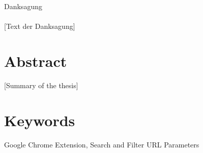 \documentclass[oneside,bibliography=totocnumbered,BCOR=5mm]{scrbook}%
\theoremstyle{definition}
\theoremstyle{definition}
\theoremstyle{definition}
\theoremstyle{definition}
\theoremstyle{definition}
\theoremstyle{definition}
\begin{document}
\newpage

\thispagestyle{empty}       %
\vspace*{2.2cm}
\noindent %
{\Huge Danksagung}\\
\vspace*{1.6cm} \\

\pagestyle{headings}
[Text der Danksagung]

\newpage
\thispagestyle{empty}       %

\section*{Abstract}
 [Summary of the thesis]

\section*{Keywords}
Google Chrome Extension, Search and Filter URL Parameters

\clearpage


\tableofcontents

\listoffigures

\lstlistoflistings

\newpage











\end{document}
